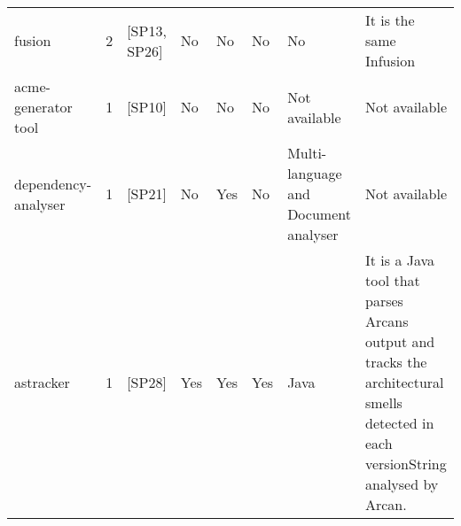 \begin{tabular}{lrllllll}
              fusion &      2 &                                           [SP13, SP26] &    No &       No &        No &                                                                                                                                                                                      No &                                                                                                                                                                                                                                                                                                                                                                                          It is the same Infusion \\
 acme-generator tool &      1 &                                                 [SP10] &    No &       No &        No &                                                                                                                                                                           Not available &                                                                                                                                                                                                                                                                                                                                                                                                    Not available \\
 dependency-analyser &      1 &                                                 [SP21] &    No &      Yes &        No &                                                                                                                                                    Multi-language and Document analyser &                                                                                                                                                                                                                                                                                                                                                                                                    Not available \\
           astracker &      1 &                                                 [SP28] &   Yes &      Yes &       Yes &                                                                                                                                                                                    Java &                                                                                                                                                                                                                                                                                It is a Java tool that parses Arcans output and tracks the architectural smells detected in each versionString analysed by Arcan. \\

\end{tabular}
